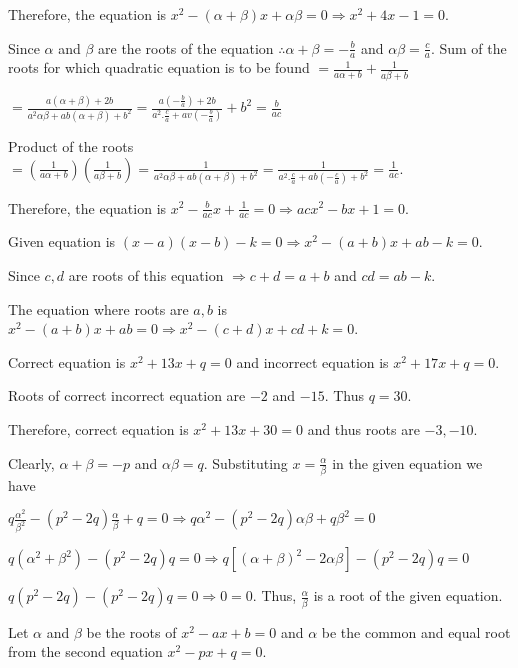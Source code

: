   Therefore, the equation is $x^2 - (\alpha + \beta)x + \alpha\beta = 0 \Rightarrow x^2 + 4x -1 = 0$.
\item Since $\alpha$ and $\beta$ are the roots of the equation $\therefore \alpha + \beta = -\frac{b}{a}$ and
  $\alpha\beta = \frac{c}{a}$. Sum of the roots for which quadratic equation is to be found $=
  \frac{1}{a\alpha + b} + \frac{1}{a\beta + b}$

  $= \frac{a(\alpha + \beta) + 2b}{a^2\alpha\beta + ab(\alpha + \beta) + b^2} = \frac{a\left(-\frac{b}{a}\right) +
    2b}{a^2.\frac{c}{a} + av\left(-\frac{b}{a}\right)} + b^2 = \frac{b}{ac}$

  Product of the roots $= \left(\frac{1}{a\alpha + b}\right)\left(\frac{1}{a\beta + b}\right) =
  \frac{1}{a^2\alpha\beta + ab(\alpha + \beta) + b^2} = \frac{1}{a^2.\frac{c}{a} +
    ab\left(-\frac{c}{a}\right) + b^2} = \frac{1}{ac}$.

  Therefore, the equation is $x^2 - \frac{b}{ac}x + \frac{1}{ac} = 0 \Rightarrow acx^2 - bx + 1 = 0$.
\item Given equation is $(x - a)(x - b) - k = 0 \Rightarrow x^2 - (a + b)x + ab - k = 0$.

  Since $c, d$ are roots of this equation $\Rightarrow c + d = a + b$ and $cd = ab - k$.

  The equation where roots are $a, b$ is $x^2 - (a + b)x + ab = 0 \Rightarrow x^2 - (c + d)x + cd + k = 0$.
\item Correct equation is $x^2 + 13x + q = 0$ and incorrect equation is $x^2 + 17x + q = 0$.

  Roots of correct incorrect equation are $-2$ and $-15.$ Thus $q = 30$.

  Therefore, correct equation is $x^2 + 13x + 30 = 0$ and thus roots are $-3, -10$.
\item Clearly, $\alpha + \beta = -p$ and $\alpha\beta = q$. Substituting $x = \frac{\alpha}{\beta}$ in the
  given equation we have

  $q\frac{\alpha^2}{\beta^2} - (p^2 - 2q)\frac{\alpha}{\beta} + q = 0 \Rightarrow q\alpha^2 - (p^2 -
  2q)\alpha\beta + q\beta^2 = 0$

  $q(\alpha^2 + \beta^2) - (p^2 - 2q)q = 0 \Rightarrow q[(\alpha + \beta)^2 - 2\alpha\beta] - (p^2 - 2q)q = 0$

  $q(p^2 - 2q) - (p^2 - 2q)q = 0 \Rightarrow 0 = 0$. Thus, $\frac{\alpha}{\beta}$ is a root of the given
  equation.
\item Let $\alpha$ and $\beta$ be the roots of $x^2 - ax + b = 0$ and $\alpha$ be the common and equal root
  from the second equation $x^2 - px + q = 0$.

